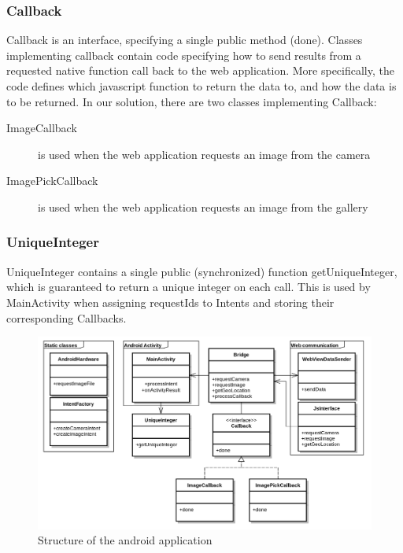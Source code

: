 	
\subsubsection{Callback} 
Callback is an interface, specifying a single public method (done). Classes implementing callback contain code specifying how to send results from a requested native function call back to the web application. More specifically, the code defines which javascript function to return the data to, and how the data is to be returned. In our solution, there are two classes implementing Callback:
	\begin{description}
		\item[ImageCallback] is used when the web application requests an image from the camera
		
		\item[ImagePickCallback] is used when the web application requests an image from the gallery
	\end{description}
	
\subsubsection{UniqueInteger} 
UniqueInteger contains a single public (synchronized) function getUniqueInteger, which is guaranteed to return a unique integer on each call. This is used by MainActivity when assigning requestIds to Intents and storing their corresponding Callbacks.

\begin{figure}[h!]
	\centering
    \includegraphics[width=120mm,natwidth=800,natheight=600]{./img/polluxuml.png}
    \caption{Structure of the android application}
    \label{fig:nativeuml}
\end{figure}

